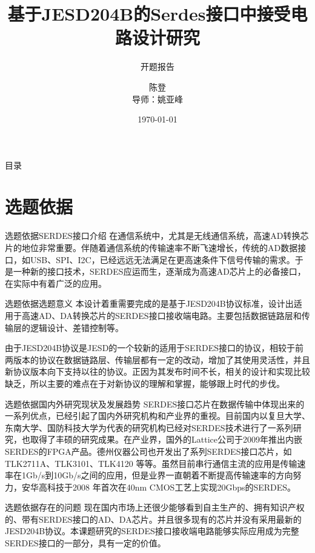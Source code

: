 \documentclass{beamer}
\title{基于JESD204B的Serdes接口中接受电路设计研究}
\subtitle{开题报告}
\author{陈登 \\导师：姚亚峰}
\date{\today}
\begin{document}
\begin{frame}
	\titlepage
\end{frame}

\begin{frame}{目录}
	\tableofcontents
\end{frame}

\section{选题依据}

\begin{frame}{选题依据}{SERDES接口介绍}
在通信系统中，尤其是无线通信系统，高速AD转换芯片的地位非常重要。伴随着通信系统的传输速率不断飞速增长，传统的AD数据接口，如USB、SPI、I2C，已经远远无法满足在更高速条件下信号传输的需求。于是一种新的接口技术，SERDES应运而生，逐渐成为高速AD芯片上的必备接口，在实际中有着广泛的应用。
\end{frame}

\begin{frame}{选题依据}{选题意义}
本设计着重需要完成的是基于JESD204B协议标准，设计出适用于高速AD、DA转换芯片的SERDES接口接收端电路。主要包括数据链路层和传输层的逻辑设计、差错控制等。

由于JESD204B协议是JESD的一个较新的适用于SERDES接口的协议，相较于前两版本的协议在数据链路层、传输层都有一定的改动，增加了其使用灵活性，并且新协议版本向下支持以往的协议。正因为其发布时间不长，相关的设计和实现比较缺乏，所以主要的难点在于对新协议的理解和掌握，能够跟上时代的步伐。
\end{frame}

\begin{frame}{选题依据}{国内外研究现状及发展趋势}
SERDES接口芯片在数据传输中体现出来的一系列优点，已经引起了国内外研究机构和产业界的重视。目前国内以复旦大学、东南大学、国防科技大学为代表的研究机构已经对SERDES技术进行了一系列研究，也取得了丰硕的研究成果。在产业界，国外的Lattice公司于2009年推出内嵌SERDES的FPGA产品。德州仪器公司也开发出了系列SERDES接口芯片，如 TLK2711A、TLK3101、TLK4120 等等。虽然目前串行通信主流的应用是传输速率在1Gb/s到10Gb/s之间的应用，但是业界一直朝着不断提高传输速率的方向努力，安华高科技于2008 年首次在40nm CMOS工艺上实现20Gbps的SERDES。
\end{frame}

\begin{frame}{选题依据}{存在的问题}
现在国内市场上还很少能够看到自主生产的、拥有知识产权的、带有SERDES接口的AD、DA芯片。并且很多现有的芯片并没有采用最新的JESD204B协议。本课题研究的SERDES接口接收端电路能够实际应用成为完整SERDES接口的一部分，具有一定的价值。
\end{frame}
\end{document}
